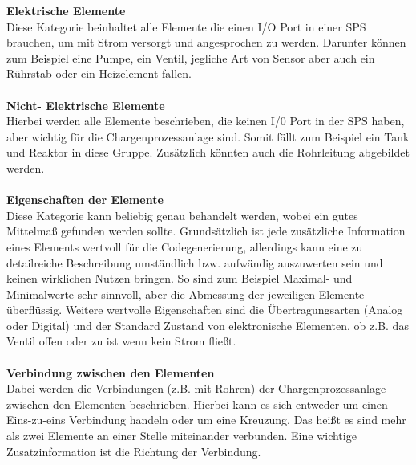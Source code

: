 \textbf{Elektrische Elemente}\\
Diese Kategorie beinhaltet alle Elemente die einen I/O Port in einer \ac{SPS} brauchen, um mit Strom versorgt und angesprochen zu werden. Darunter können zum Beispiel eine Pumpe, ein Ventil, jegliche Art von Sensor aber auch ein Rührstab oder ein Heizelement fallen. \\\\
\textbf{Nicht- Elektrische Elemente}\\
Hierbei werden alle Elemente beschrieben, die keinen I/0 Port in der \ac{SPS} haben, aber wichtig für die Chargenprozessanlage sind. Somit fällt zum Beispiel ein Tank und Reaktor in diese Gruppe. Zusätzlich könnten auch die Rohrleitung abgebildet werden.\\\\
\textbf{Eigenschaften der Elemente}  \\
Diese Kategorie kann beliebig genau behandelt werden, wobei ein gutes Mittelmaß gefunden werden sollte. Grundsätzlich ist jede zusätzliche Information eines Elements wertvoll für die Codegenerierung, allerdings kann eine zu detailreiche Beschreibung umständlich bzw. aufwändig auszuwerten sein und keinen wirklichen Nutzen bringen.
So sind zum Beispiel Maximal- und Minimalwerte sehr sinnvoll, aber die Abmessung der jeweiligen Elemente überflüssig. Weitere wertvolle Eigenschaften sind die Übertragungsarten (Analog oder Digital) und der Standard Zustand von elektronische Elementen, ob z.B. das Ventil offen oder zu ist wenn kein Strom fließt.   \\\\
\textbf{Verbindung zwischen den Elementen}  \\
Dabei werden die Verbindungen (z.B. mit Rohren) der Chargenprozessanlage zwischen den Elementen beschrieben. 
Hierbei kann es sich entweder um einen Eins-zu-eins Verbindung handeln oder um eine Kreuzung. Das heißt es sind mehr als zwei Elemente an einer Stelle miteinander verbunden. Eine wichtige Zusatzinformation ist die Richtung der Verbindung.


